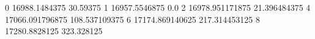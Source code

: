 0 16988.1484375 30.59375
1 16957.5546875 0.0
2 16978.951171875 21.396484375
4 17066.091796875 108.537109375
6 17174.869140625 217.314453125
8 17280.8828125 323.328125
